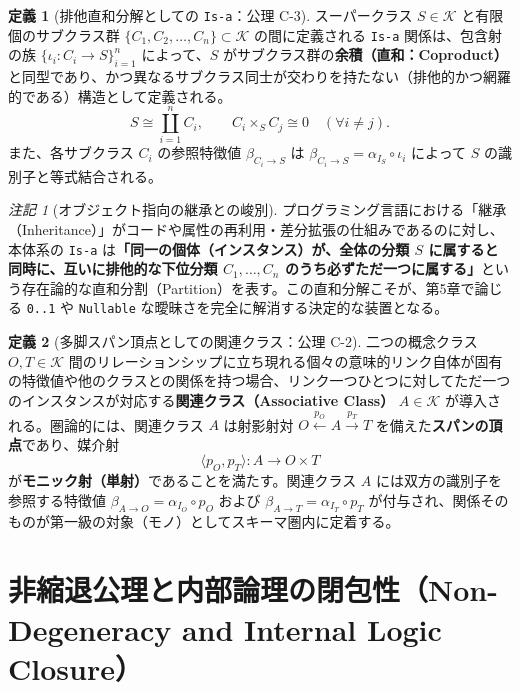 \documentclass[11pt,a4paper]{ltjsarticle}
\theoremstyle{definition}
\newtheorem{definition}{定義}[section]
\theoremstyle{plain}
\theoremstyle{remark}
\newtheorem{remark}{注記}[section]
\begin{document}
\begin{definition}[排他直和分解としての \texttt{Is-a}：公理 C-3]\label{def:isa}
スーパークラス $S \in \mathcal{K}$ と有限個のサブクラス群 $\{C_1, C_2, \dots, C_n\} \subset \mathcal{K}$ の間に定義される \texttt{Is-a} 関係は、包含射の族 $\{\iota_i : C_i \to S\}_{i=1}^n$ によって、$S$ がサブクラス群の\textbf{余積（直和：Coproduct）}と同型であり、かつ異なるサブクラス同士が交わりを持たない（排他的かつ網羅的である）構造として定義される。
\begin{equation}
S \cong \coprod_{i=1}^n C_i, \qquad C_i \times_S C_j \cong 0 \quad (\forall i \neq j).
\end{equation}
また、各サブクラス $C_i$ の参照特徴値 $\beta_{C_i \to S}$ は $\beta_{C_i \to S} = \alpha_{I_S} \circ \iota_i$ によって $S$ の識別子と等式結合される。
\end{definition}

\begin{remark}[オブジェクト指向の継承との峻別]
プログラミング言語における「継承（Inheritance）」がコードや属性の再利用・差分拡張の仕組みであるのに対し、本体系の \texttt{Is-a} は\textbf{「同一の個体（インスタンス）が、全体の分類 $S$ に属すると同時に、互いに排他的な下位分類 $C_1, \dots, C_n$ のうち必ずただ一つに属する」}という存在論的な直和分割（Partition）を表す。この直和分解こそが、第5章で論じる \texttt{0..1} や \texttt{Nullable} な曖昧さを完全に解消する決定的な装置となる。
\end{remark}

\begin{definition}[多脚スパン頂点としての関連クラス：公理 C-2]\label{def:associative}
二つの概念クラス $O, T \in \mathcal{K}$ 間のリレーションシップに立ち現れる個々の意味的リンク自体が固有の特徴値や他のクラスとの関係を持つ場合、リンク一つひとつに対してただ一つのインスタンスが対応する\textbf{関連クラス（Associative Class）} $A \in \mathcal{K}$ が導入される。圏論的には、関連クラス $A$ は射影射対 $O \xleftarrow{p_O} A \xrightarrow{p_T} T$ を備えた\textbf{スパンの頂点}であり、媒介射
\begin{equation}
\langle p_O, p_T \rangle : A \longrightarrow O \times T
\end{equation}
が\textbf{モニック射（単射）}であることを満たす。関連クラス $A$ には双方の識別子を参照する特徴値 $\beta_{A \to O} = \alpha_{I_O} \circ p_O$ および $\beta_{A \to T} = \alpha_{I_T} \circ p_T$ が付与され、関係そのものが第一級の対象（モノ）としてスキーマ圏内に定着する。
\end{definition}

\section{非縮退公理と内部論理の閉包性（Non-Degeneracy and Internal Logic Closure）}
\end{document}
